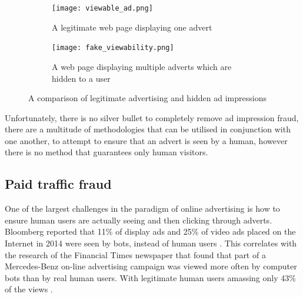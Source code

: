 \documentclass[12pt]{article}
\begin{document}
\begin{figure}[H]
    \begin{subfigure}{0.3\textwidth}
        \texttt{[image: viewable\_ad.png]}
        \caption{A legitimate web page displaying one advert \parencite{spiderIo}}
        \label{fig:legitAd}
    \end{subfigure} \hspace{0.2\textwidth}
    \begin{subfigure}{0.3\textwidth}
        \texttt{[image: fake\_viewability.png]}
        \caption{A web page displaying multiple adverts which are hidden to a user \parencite{spiderIo}}
        \label{fig:adFraud}
    \end{subfigure}
    \caption{A comparison of legitimate advertising and hidden ad impressions}
    \label{fig:adstack}
\end{figure}

Unfortunately, there is no silver bullet to completely remove ad impression fraud, there are a multitude of methodologies that can be utilised in conjunction with one another, to attempt to ensure that an advert is seen by a human, however there is no method that guarantees only human visitors. 

\subsection{Paid traffic fraud}
One of the largest challenges in the paradigm of online advertising is how to ensure human users are actually seeing and then clicking through adverts. Bloomberg reported that 11\% of display ads and 25\% of video ads placed on the Internet in 2014 were seen by bots, instead of human users \parencite{bloomFraud}. This correlates with the research of the Financial Times newspaper that found that part of a Mercedes-Benz on-line advertising campaign was viewed more often by computer bots than by real human users. With legitimate human users amassing only 43\% of the views \parencite{mercFraud}. \\
\end{document}
